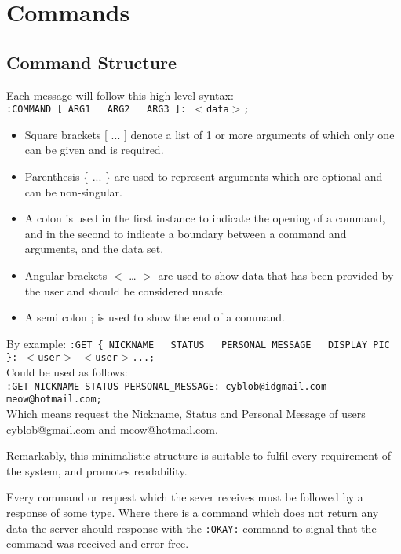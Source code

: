 \section{Commands}

\subsection{Command Structure}

Each message will follow this high level syntax: \\
\texttt{:COMMAND [ ARG1 \ \vline \ ARG2 \ \vline \ ARG3 ]: $<$data$>$;} \\

\begin{itemize}

\item{Square brackets [ ... ] denote a list of 1 or more arguments of which only one can be given and is required.}  

\item{Parenthesis \{ ... \} are used to represent arguments which are optional and can be non-singular.}

\item{A colon is used in the first instance to indicate the opening of a command, and in the second to indicate a boundary between a command and arguments, and the data set.}

\item{Angular brackets $<$ … $>$ are used to show data that has been provided by the user and should be considered unsafe.}

\item{A semi colon ; is used to show the end of a command.}

\end{itemize}

By example:
\texttt{:GET \{ NICKNAME \ \vline \ STATUS \ \vline \ PERSONAL\_MESSAGE \ \vline \ DISPLAY\_PIC \}: $<$user$>$ $<$user$>$...;}\\
Could be used as follows: \\
\texttt{:GET NICKNAME STATUS PERSONAL\_MESSAGE: cyblob@idgmail.com meow@hotmail.com;} \\
Which means request the Nickname, Status and Personal Message of users cyblob@gmail.com and meow@hotmail.com.

Remarkably, this minimalistic structure is suitable to fulfil every requirement of the system, and promotes readability.

Every command or request which the sever receives must be followed by a response of some type. Where there is a command which does not return any data the server should response with the \texttt{:OKAY:} command to signal that the command was received and error free.

